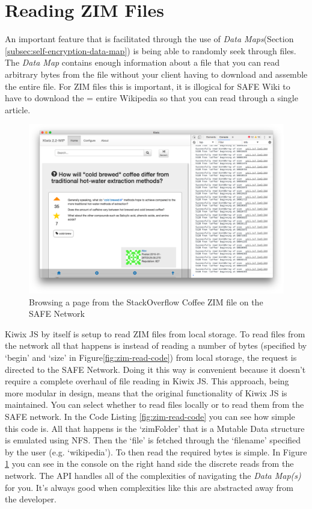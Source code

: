 \section{Reading ZIM Files}
 
An important feature that is facilitated through the use of \textit{Data Maps}(Section \ref{subsec:self-encryption-data-map}) is being able to randomly seek through files. The \textit{Data Map} contains enough information about a file that you can read arbitrary bytes from the file without your client having to download and assemble the entire file. For ZIM files this is important, it is illogical for SAFE Wiki to have to download the = entire Wikipedia so that you can read through a single article.

\begin{figure}[h]
	\begin{center}
		\includegraphics[width=\textwidth]{images/safe-wiki-browsing-coffee}
		\caption{Browsing a page from the StackOverflow Coffee ZIM file on the SAFE Network}
		\label{fig:browsing-coffee}
	\end{center}
\end{figure}

Kiwix JS by itself is setup to read ZIM files from local storage. To read files from the network all that happens is instead of reading a number of bytes (specified by `begin' and `size' in Figure\ref{fig:zim-read-code}) from local storage, the request is directed to the SAFE Network. Doing it this way is convenient because it doesn't require a complete overhaul of file reading in Kiwix JS. This approach, being more modular in design, means that the original functionality of Kiwix JS is maintained. You can select whether to read files locally or to read them from the SAFE network. In the Code Listing \ref{fig:zim-read-code} you can see how simple this code is. All that happens is the `zimFolder' that is a Mutable Data structure is emulated using NFS. Then the `file' is fetched through the `filename' specified by the user (e.g. `wikipedia'). To then read the required bytes is simple. In Figure \ref{fig:browsing-coffee} you can see in the console on the right hand side the discrete reads from the network. The API handles all of the complexities of navigating the \textit{Data Map(s)} for you. It's always good when complexities like this are abstracted away from the developer.

